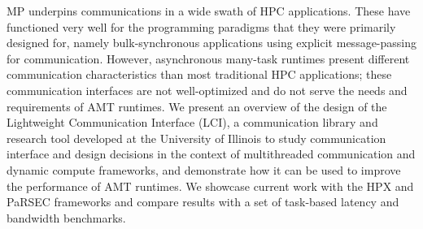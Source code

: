 MP underpins communications in a wide swath of HPC applications. These have functioned very well for the programming paradigms that they were primarily designed for, namely bulk-synchronous applications using explicit message-passing for communication. However, asynchronous many-task runtimes present different communication characteristics than most traditional HPC applications; these communication interfaces are not well-optimized and do not serve the needs and requirements of AMT runtimes. We present an overview of the design of the Lightweight Communication Interface (LCI), a communication library and research tool developed at the University of Illinois to study communication interface and design decisions in the context of multithreaded communication and dynamic compute frameworks, and demonstrate how it can be used to improve the performance of AMT runtimes. We showcase current work with the HPX and PaRSEC frameworks and compare results with a set of task-based latency and bandwidth benchmarks.
